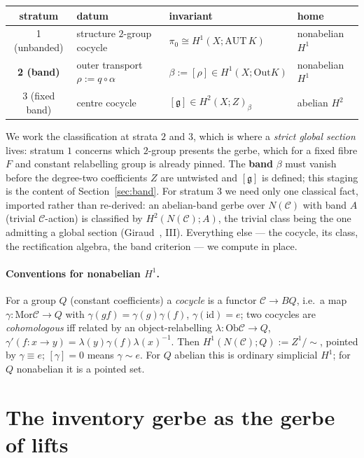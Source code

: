 \documentclass[11pt]{article}
\theoremstyle{definition}
\newcommand{\C}{\mathcal{C}}
\newcommand{\Ob}{\mathrm{Ob}}
\newcommand{\Mor}{\mathrm{Mor}}
\newcommand{\id}{\mathrm{id}}
\newcommand{\Out}{\mathrm{Out}}
\newcommand{\Zc}{Z}
\newcommand{\gerbe}{\mathfrak{g}}
\begin{document}
\begin{center}
\begin{tabular}{clll}
\toprule
stratum & datum & invariant & home\\
\midrule
1 (unbanded) & structure $2$-group cocycle & $\pi_0 \cong H^1(X;\mathrm{AUT}\,K)$ & nonabelian $H^1$\\
\textbf{2 (band)} & outer transport $\rho:=q\circ\alpha$ & $\beta:=[\rho]\in H^1(X;\Out K)$ & nonabelian $H^1$\\
3 (fixed band) & centre cocycle & $[\gerbe]\in H^2(X;\Zc)_\beta$ & abelian $H^2$\\
\bottomrule
\end{tabular}
\end{center}

We work the classification at strata $2$ and $3$, which is where a \emph{strict global section}
lives: stratum $1$ concerns which $2$-group presents the gerbe, which for a fixed fibre $F$ and
constant relabelling group is already pinned. The \textbf{band} $\beta$ must vanish before the
degree-two coefficients $\Zc$ are untwisted and $[\gerbe]$ is defined; this staging is the content
of Section~\ref{sec:band}. For stratum $3$ we need only one classical fact, imported rather than
re-derived: an abelian-band gerbe over $N(\C)$ with band $A$ (trivial $\C$-action) is classified
by $H^2(N(\C);A)$, the trivial class being the one admitting a global section (Giraud~\cite{giraud},
III). Everything else --- the cocycle, its class, the rectification algebra, the band criterion ---
we compute in place.

\paragraph{Conventions for nonabelian $H^1$.}
For a group $Q$ (constant coefficients) a \emph{cocycle} is a functor $\C\to BQ$, i.e.\ a map
$\gamma:\Mor\C\to Q$ with $\gamma(gf)=\gamma(g)\gamma(f)$, $\gamma(\id)=e$; two cocycles are
\emph{cohomologous} iff related by an object-relabelling $\lambda:\Ob\C\to Q$,
$\gamma'(f:x\to y)=\lambda(y)\gamma(f)\lambda(x)^{-1}$. Then $H^1(N(\C);Q):=Z^1/{\sim}$, pointed
by $\gamma\equiv e$; $[\gamma]=0$ means $\gamma\sim e$. For $Q$ abelian this is ordinary
simplicial $H^1$; for $Q$ nonabelian it is a pointed set.

\section{The inventory gerbe as the gerbe of lifts}\label{sec:gerbe}
\end{document}
